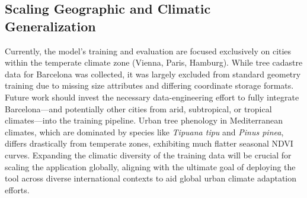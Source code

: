 \subsection{Scaling Geographic and Climatic Generalization}
Currently, the model's training and evaluation are focused exclusively on cities within the temperate climate zone (Vienna, Paris, Hamburg). While tree cadastre data for Barcelona was collected, it was largely excluded from standard geometry training due to missing size attributes and differing coordinate storage formats. Future work should invest the necessary data-engineering effort to fully integrate Barcelona---and potentially other cities from arid, subtropical, or tropical climates---into the training pipeline. Urban tree phenology in Mediterranean climates, which are dominated by species like \textit{Tipuana tipu} and \textit{Pinus pinea}, differs drastically from temperate zones, exhibiting much flatter seasonal NDVI curves. Expanding the climatic diversity of the training data will be crucial for scaling the application globally, aligning with the ultimate goal of deploying the tool across diverse international contexts to aid global urban climate adaptation efforts.
